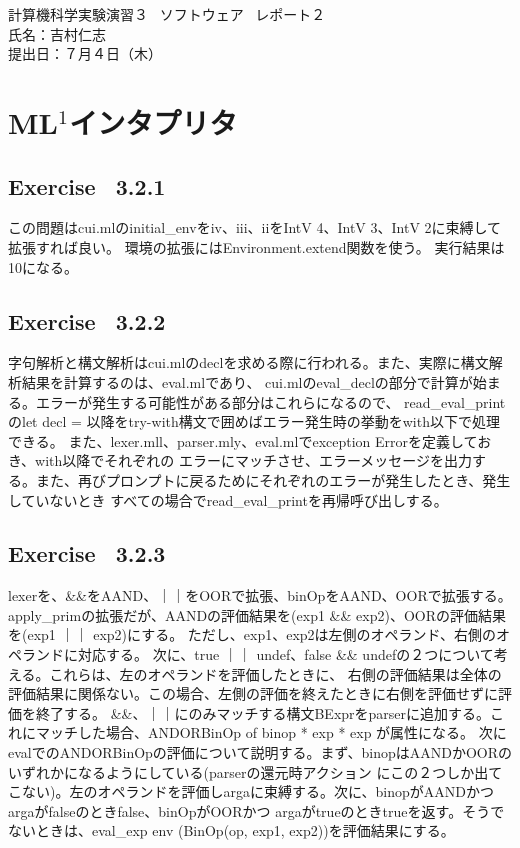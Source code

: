 \documentclass{jreport}
\begin{document}
	\begin{center}
		計算機科学実験演習３ \ ソフトウェア \ レポート２	\\
		氏名：吉村仁志	\\
		提出日：７月４日（木）
	\newpage
	\end{center}
	\chapter{ML$^1$インタプリタ}
		\section{Exercise \ 3.2.1}
			この問題はcui.mlのinitial\_envをiv、iii、iiをIntV 4、IntV 3、IntV 2に束縛して拡張すれば良い。
			環境の拡張にはEnvironment.extend関数を使う。
			実行結果は10になる。
		\section{Exercise \ 3.2.2}
			字句解析と構文解析はcui.mlのdeclを求める際に行われる。また、実際に構文解析結果を計算するのは、eval.mlであり、
			cui.mlのeval\_declの部分で計算が始まる。エラーが発生する可能性がある部分はこれらになるので、
			read\_eval\_printのlet decl = 以降をtry-with構文で囲めばエラー発生時の挙動をwith以下で処理できる。
			また、lexer.mll、parser.mly、eval.mlでexception Errorを定義しておき、with以降でそれぞれの
			エラーにマッチさせ、エラーメッセージを出力する。また、再びプロンプトに戻るためにそれぞれのエラーが発生したとき、発生していないとき
			すべての場合でread\_eval\_printを再帰呼び出しする。
		\section{Exercise \ 3.2.3}
			lexerを、\&\&をAAND、｜｜をOORで拡張、binOpをAAND、OORで拡張する。
			apply\_primの拡張だが、AANDの評価結果を(exp1 \&\& exp2)、OORの評価結果を(exp1 ｜｜ exp2)にする。
			ただし、exp1、exp2は左側のオペランド、右側のオペランドに対応する。
			次に、true ｜｜ undef、false \&\& undefの２つについて考える。これらは、左のオペランドを評価したときに、
			右側の評価結果は全体の評価結果に関係ない。この場合、左側の評価を終えたときに右側を評価せずに評価を終了する。
			\&\&、｜｜にのみマッチする構文BExprをparserに追加する。これにマッチした場合、ANDORBinOp of binop * exp * exp が属性になる。
			次にevalでのANDORBinOpの評価について説明する。まず、binopはAANDかOORのいずれかになるようにしている(parserの還元時アクション
			にこの２つしか出てこない)。左のオペランドを評価しargaに束縛する。次に、binopがAANDかつargaがfalseのときfalse、binOpがOORかつ
			argaがtrueのときtrueを返す。そうでないときは、eval\_exp env (BinOp(op, exp1, exp2))を評価結果にする。
\end{document}
